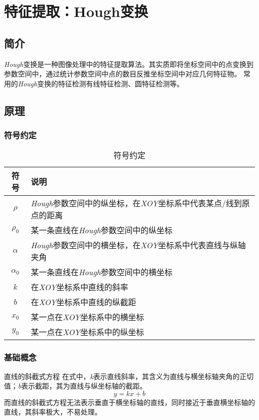 
\section{特征提取：Hough变换}
\subsection{简介}

    \textit{Hough}变换是一种图像处理中的特征提取算法。其实质即将坐标空间中的点变换到参数空间中，通过统计参数空间中点的数目反推坐标空间中对应几何特征物。
    常用的\textit{Hough}变换的特征检测有线特征检测、圆特征检测等。

\subsection{原理}
    \subsubsection{符号约定}
        
    \begin{table}[H]
        \centering
        \begin{tabular}{cl}
            \toprule
              符号  & 说明 \\
            \midrule
                $\rho$  & \textit{Hough}参数空间中的纵坐标，在\textit{XOY}坐标系中代表某点/线到原点的距离  \\
                $\rho_0$  & 某一条直线在\textit{Hough}参数空间中的纵坐标  \\
                $\alpha$  & \textit{Hough}参数空间中的横坐标，在\textit{XOY}坐标系中代表直线与纵轴夹角  \\
                $\alpha_0$  & 某一条直线在\textit{Hough}参数空间中的横坐标  \\
                $k$  & 在\textit{XOY}坐标系中直线的斜率  \\
                $b$ & 在\textit{XOY}坐标系中直线的纵截距\\
                $x_0$ & 某一点在\textit{XOY}坐标系中的横坐标 \\
                $y_0$ & 某一点在\textit{XOY}坐标系中的纵坐标 \\
            \bottomrule
        \end{tabular}
        \caption{符号约定}
        \label{hough_symbol}
    \end{table}

    \subsubsection{基础概念}
        \begin{theorem}{直线的斜截式方程}
            在式中，\textit{k}表示直线斜率，其含义为直线与横坐标轴夹角的正切值；\textit{b}表示截距，其为直线与纵坐标轴的截距。
            \begin{equation}
                \label{line_kb}
                y=kx+b
            \end{equation}
            而直线的斜截式方程无法表示垂直于横坐标轴的直线，同时接近于垂直横坐标轴的直线，其斜率极大，不易处理。
        \end{theorem}


